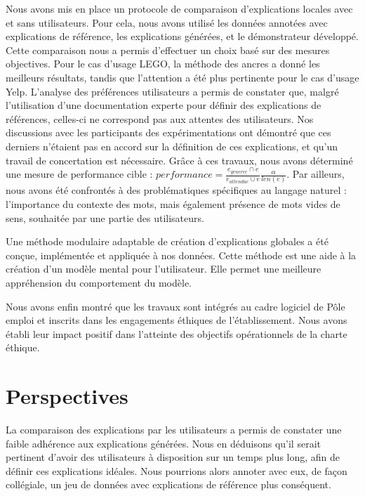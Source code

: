 Nous avons mis en place un protocole de comparaison d'explications locales avec et sans utilisateurs. Pour cela, nous avons utilisé les données annotées avec explications de référence, les explications générées, et le démonstrateur développé. Cette comparaison nous a permis d'effectuer un choix basé sur des mesures objectives. Pour le cas d'usage LEGO, la méthode des ancres a donné les meilleurs résultats, tandis que l'attention a été plus pertinente pour le cas d'usage Yelp. L'analyse des préférences utilisateurs a permis de constater que, malgré l'utilisation d'une documentation experte pour définir des explications de références, celles-ci ne correspond pas aux attentes des utilisateurs. Nos discussions avec les participants des expérimentations ont démontré que ces derniers n'étaient pas en accord sur la définition de ces explications, et qu'un travail de concertation est nécessaire. Grâce à ces travaux, nous avons déterminé une mesure de performance cible : $performance = \frac{e_{generee} \cap e}{e_{attendue} \cup e} \frac{\alpha}{len(e)}$.
Par ailleurs, nous avons été confrontés à des problématiques spécifiques au langage naturel : l'importance du contexte des mots, mais également présence de mots vides de sens, souhaitée par une partie des utilisateurs.

Une méthode modulaire adaptable de création d'explications globales a été conçue, implémentée et appliquée à nos données. Cette méthode est une aide à la création d'un modèle mental pour l'utilisateur. Elle permet une meilleure appréhension du comportement du modèle.

Nous avons enfin montré que les travaux sont intégrés au cadre logiciel de Pôle emploi et inscrits dans les engagements éthiques de l'établissement. Nous avons établi leur impact positif dans l'atteinte des objectifs opérationnels de la charte éthique.

\section*{Perspectives}

La comparaison des explications par les utilisateurs a permis de constater une faible adhérence aux explications générées. Nous en déduisons qu'il serait pertinent d'avoir des utilisateurs à disposition sur un temps plus long, afin de définir ces explications idéales. Nous pourrions alors annoter avec eux, de façon collégiale, un jeu de données avec explications de référence plus conséquent.

